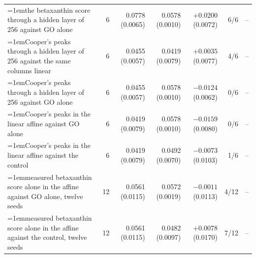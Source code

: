 \begin{table}[H]
\begin{tabular}{@{}>{\raggedright\hangindent=1em\hangafter=1\arraybackslash}p{84.3mm}rrrrrr@{}}
    the betaxanthin score through a hidden layer of 256 against GO alone & 6 & 0.0778 (0.0065) & 0.0578 (0.0010) & $+0.0200$ (0.0072) & 6/6 & -- \\
    Cooper's peaks through a hidden layer of 256 against the same columns linear & 6 & 0.0455 (0.0057) & 0.0419 (0.0079) & $+0.0035$ (0.0077) & 4/6 & -- \\
    Cooper's peaks through a hidden layer of 256 against GO alone & 6 & 0.0455 (0.0057) & 0.0578 (0.0010) & $-0.0124$ (0.0062) & 0/6 & -- \\
    Cooper's peaks in the linear affine against GO alone & 6 & 0.0419 (0.0079) & 0.0578 (0.0010) & $-0.0159$ (0.0080) & 0/6 & -- \\
    Cooper's peaks in the linear affine against the control & 6 & 0.0419 (0.0079) & 0.0492 (0.0070) & $-0.0073$ (0.0103) & 1/6 & -- \\
    measured betaxanthin score alone in the affine against GO alone, twelve seeds & 12 & 0.0561 (0.0115) & 0.0572 (0.0019) & $-0.0011$ (0.0113) & 4/12 & -- \\
    measured betaxanthin score alone in the affine against the control, twelve seeds & 12 & 0.0561 (0.0115) & 0.0482 (0.0097) & $+0.0078$ (0.0170) & 7/12 & -- \\
    \hline
  \end{tabular}
\end{table}

